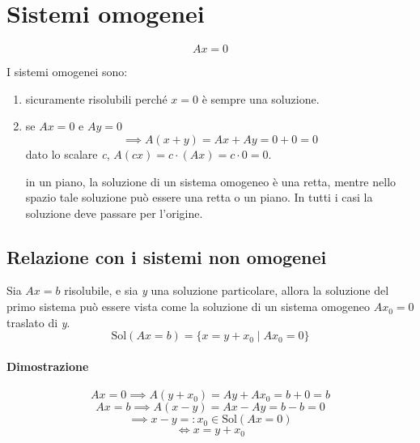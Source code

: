 	\section{Sistemi omogenei}
		$$ Ax = 0 $$
		
		I sistemi omogenei sono:
		\begin{enumerate}
			\item sicuramente risolubili perché $ x = 0 $ è sempre una soluzione.
			\item se $ Ax = 0 $ e $ Ay = 0 $
			$$ \implies A ( x + y ) = Ax + Ay = 0 + 0 = 0 $$
			dato lo scalare \textit{c}, $ A(cx) = c \cdot (Ax) = c \cdot 0 = 0 $.
			\begin{GrayBox}
				in un piano, la soluzione di un sistema omogeneo è una retta, mentre nello spazio tale soluzione può essere una retta o un piano. In tutti i casi la soluzione deve passare per l'origine.
			\end{GrayBox}
		\end{enumerate}
		
		\subsection{Relazione con i sistemi non omogenei}
			Sia $ Ax = b $ risolubile, e sia \textit{y} una soluzione particolare, allora la soluzione del primo sistema può essere vista come la soluzione di un sistema omogeneo $ Ax_0 = 0 $ traslato di \textit{y}.
			$$ \text{Sol} (Ax = b) = \{ x = y + x_0 \; \vert \; Ax_0 = 0 \} $$ 
			
			\begin{GrayBox}
				\paragraph{Dimostrazione} 
				$$ Ax = 0 \implies A (y + x_0) = Ay + Ax_0 = b + 0 = b $$
				$$ Ax = b \implies A ( x - y ) = Ax - Ay = b - b = 0 $$
				$$ \implies x - y =: x_0 \in \text{Sol} ( Ax = 0 ) $$
				$$ \iff x = y + x_0 $$ 
			\end{GrayBox}
		
